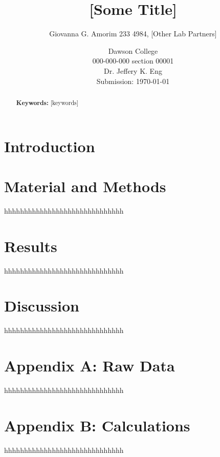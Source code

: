 \documentclass[letterpaper]{article}
\title{[Some Title]}
\author{Giovanna G. Amorim 233 4984, [Other Lab Partners]}
\date{Dawson College \\[15pt]
000-000-000 section 00001\\[15pt]
Dr. Jeffery K. Eng\\[15pt]
Submission: \today}
\begin{document}
\maketitle

\begin{abstract}
    
	\noindent\textbf{Keywords:} [keywords]
\end{abstract}

\tableofcontents

\newpage

\section{Introduction}
\label{sec:introduction}



\section{Material and Methods}
\label{sec:matandmet}

hhhhhhhhhhhhhhhhhhhhhhhhhhhhhh

\section{Results}
\label{sec:results}

hhhhhhhhhhhhhhhhhhhhhhhhhhhhhh

\section{Discussion}
\label{sec:discussion}

hhhhhhhhhhhhhhhhhhhhhhhhhhhhhh

\printbibliography[heading=bibintoc]

\section*{Appendix A: Raw Data}
\label{sec:appendixa}

hhhhhhhhhhhhhhhhhhhhhhhhhhhhhh

\section*{Appendix B: Calculations}
\label{sec:appendixb}

hhhhhhhhhhhhhhhhhhhhhhhhhhhhhh
\end{document}
